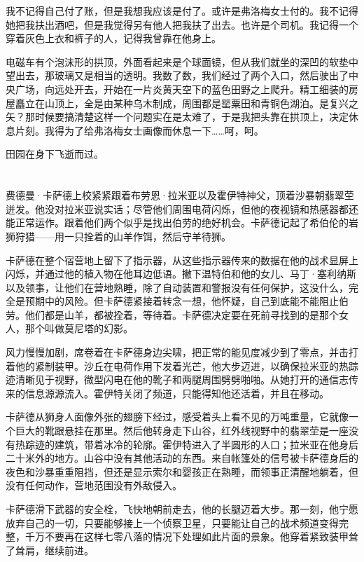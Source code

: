 \documentclass[AutoFakeBold=true]{book}
\begin{document}
我不记得自己付了账，但是我想我应该是付了。或许是弗洛梅女士付的。我不记得她把我扶出酒吧，但是我觉得另有他人把我扶了出去。也许是个司机。我记得一个穿着灰色上衣和裤子的人，记得我曾靠在他身上。

电磁车有个泡沫形的拱顶，外面看起来是个球面镜，但从我们就坐的深凹的软垫中望出去，那玻璃又是相当的透明。我数了数，我们经过了两个入口，然后驶出了中央广场，向远处开去，开始在一片炎黄天空下的蓝色田野之上爬升。精工细装的房屋矗立在山顶上，全是由某种乌木制成，周围都是罂粟田和青铜色湖泊。是复兴之矢？那时候要搞清楚这样一个问题实在是太难了，于是我把头靠在拱顶上，决定休息片刻。我得为了给弗洛梅女士画像而休息一下……呵，呵。

田园在身下飞逝而过。

\chapter{}

费德曼·卡萨德上校紧紧跟着布劳恩·拉米亚以及霍伊特神父，顶着沙暴朝翡翠茔迸发。他没对拉米亚说实话；尽管他们周围电荷闪烁，但他的夜视镜和热感器都还能正常运作。跟着他们两个似乎是找出伯劳的绝好机会。卡萨德记起了希伯伦的岩狮狩猎——用一只拴着的山羊作饵，然后守羊待狮。

卡萨德在整个宿营地上留下了指示器，从这些指示器传来的数据在他的战术显屏上闪烁，并通过他的植入物在他耳边低语。撇下温特伯和他的女儿、马丁·塞利纳斯以及领事，让他们在营地熟睡，除了自动装置和警报没有任何保护，这没什么，完全是预期中的风险。但卡萨德紧接着转念一想，他怀疑，自己到底能不能阻止伯劳。他们都是山羊，都被拴着，等待着。卡萨德决定要在死前寻找到的是那个女人，那个叫做莫尼塔的幻影。

风力慢慢加剧，席卷着在卡萨德身边尖啸，把正常的能见度减少到了零点，并击打着他的紧制装甲。沙丘在电荷作用下发着光芒，他大步迈进，以确保拉米亚的热踪迹清晰见于视野，微型闪电在他的靴子和两腿周围劈劈啪啪。从她打开的通信志传来的信息源源流入。霍伊特关闭了频道，只能得知他还活着，并且在移动。

卡萨德从狮身人面像外张的翅膀下经过，感受着头上看不见的万吨重量，它就像一个巨大的靴跟悬挂在那里。然后他转身走下山谷，红外线视野中的翡翠茔是一座没有热踪迹的建筑，带着冰冷的轮廓。霍伊特进入了半圆形的人口；拉米亚在他身后二十米外的地方。山谷中没有其他活动的东西。来自帐篷处的信号被卡萨德身后的夜色和沙暴重重阻挡，但还是显示索尔和婴孩正在熟睡，而领事正清醒地躺着，但没有任何动作，营地范围没有外敌侵入。

卡萨德滑下武器的安全栓，飞快地朝前走去，他的长腿迈着大步。那一刻，他宁愿放弃自己的一切，只要能够接上一个侦察卫星，只要能让自己的战术频道变得完整，千万不要再在这样七零八落的情况下处理如此片面的景象。他穿着紧致装甲耸了耸肩，继续前进。
\end{document}
